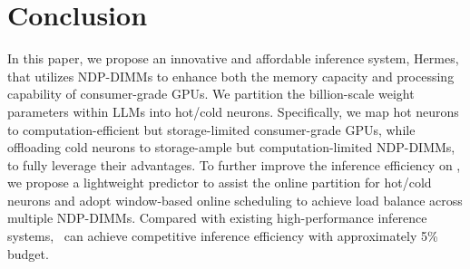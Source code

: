\section{Conclusion}\label{sec:conclusion}



In this paper, we propose an innovative and affordable inference system, Hermes, that utilizes NDP-DIMMs to enhance both the memory capacity and processing capability of consumer-grade GPUs. We partition the billion-scale weight parameters within LLMs into hot/cold neurons. Specifically, we map hot neurons to computation-efficient but storage-limited consumer-grade GPUs, while offloading cold neurons to storage-ample but computation-limited NDP-DIMMs, to fully leverage their advantages. To further improve the inference efficiency on \name, we propose a lightweight predictor to assist the online partition for hot/cold neurons and adopt window-based online scheduling to achieve load balance across multiple NDP-DIMMs. Compared with existing high-performance inference systems, \name~can achieve competitive inference efficiency with approximately 5\% budget. 